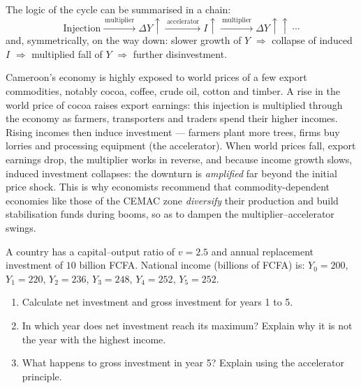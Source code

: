 \documentclass[11pt]{article}
\begin{document}
The logic of the cycle can be summarised in a chain:
\[
\text{Injection} \xrightarrow{\ \text{multiplier}\ } \Delta Y \uparrow \xrightarrow{\ \text{accelerator}\ } I \uparrow \xrightarrow{\ \text{multiplier}\ } \Delta Y \uparrow\uparrow \ \cdots
\]
and, symmetrically, on the way down: slower growth of $Y$ $\Rightarrow$ collapse of induced $I$ $\Rightarrow$ multiplied fall of $Y$ $\Rightarrow$ further disinvestment.

\begin{savaistu}
Cameroon's economy is highly exposed to world prices of a few export commodities, notably cocoa, coffee, crude oil, cotton and timber. A rise in the world price of cocoa raises export earnings: this injection is multiplied through the economy as farmers, transporters and traders spend their higher incomes. Rising incomes then induce investment --- farmers plant more trees, firms buy lorries and processing equipment (the accelerator). When world prices fall, export earnings drop, the multiplier works in reverse, and because income growth slows, induced investment collapses: the downturn is \emph{amplified} far beyond the initial price shock. This is why economists recommend that commodity-dependent economies like those of the CEMAC zone \emph{diversify} their production and build stabilisation funds during booms, so as to dampen the multiplier--accelerator swings.
\end{savaistu}

\begin{exercice}
A country has a capital--output ratio of $v=2.5$ and annual replacement investment of $10$ billion FCFA. National income (billions of FCFA) is: $Y_0=200$, $Y_1=220$, $Y_2=236$, $Y_3=248$, $Y_4=252$, $Y_5=252$.
\begin{enumerate}
\item Calculate net investment and gross investment for years 1 to 5.
\item In which year does net investment reach its maximum? Explain why it is not the year with the highest income.
\item What happens to gross investment in year 5? Explain using the accelerator principle.
\end{enumerate}
\end{exercice}
\end{document}
